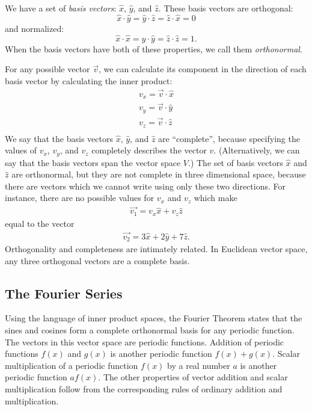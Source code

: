 \documentclass[12pt]{book}
\begin{document}
\noindent
We have a set of {\em basis vectors}: $\hat{x}$, $\hat{y}$, and $\hat{z}$.  These basis vectors are orthogonal:
\begin{displaymath}
\hat{x} \cdot \hat{y} = \hat{y} \cdot \hat{z} = \hat{z} \cdot \hat{x} = 0
\end{displaymath}
and normalized:
\begin{displaymath}
\hat{x} \cdot \hat{x} = \hat{y} \cdot \hat{y} = \hat{z} \cdot \hat{z} = 1.
\end{displaymath}
When the basis vectors have both of these properties, we call them {\em orthonormal}.

For any possible vector $\vec{v}$, we can calculate its component in the direction of each basis vector by calculating the inner product:
\begin{eqnarray*}
v_x = \vec{v} \cdot \hat{x} \\
v_y = \vec{v} \cdot \hat{y} \\
v_z = \vec{v} \cdot \hat{z} \\
\end{eqnarray*}
We say that the basis vectors $\hat{x}$, $\hat{y}$, and $\hat{z}$ are ``complete'', because specifying the values of $v_x$, $v_y$, and $v_z$ completely describes the vector $v$.  (Alternatively, we can say that the basis vectors span the vector space $V$.)  The set of basis vectors $\hat{x}$ and $\hat{z}$ are orthonormal, but they are not complete in three dimensional space, because there are vectors which we cannot write using only these two directions.  For instance, there are no possible values for $v_x$ and $v_z$
which make
\begin{eqnarray*}
 \vec{v_1} = v_x \hat{x} + v_z \hat{z}
\end{eqnarray*}
equal to the vector
\begin{eqnarray*}
 \vec{v_2} = 3 \hat{x} + 2 \hat{y} + 7 \hat{z}.
\end{eqnarray*}
Orthogonality and completeness are intimately related.  In Euclidean vector space, any three orthogonal vectors are a complete basis.
 
\subsection{The Fourier Series}

Using the language of inner product spaces, the Fourier Theorem states that the sines and cosines form a complete orthonormal basis for any periodic function.  The vectors in this vector space are periodic functions.  Addition of periodic functions $f(x)$ and $g(x)$ is another periodic function $f(x) + g(x)$.  Scalar multiplication of a periodic function $f(x)$ by a real number $a$ is another periodic function $a f(x)$.  The other properties of vector addition and scalar multiplication follow from the corresponding rules of ordinary addition and multiplication.
\end{document}

